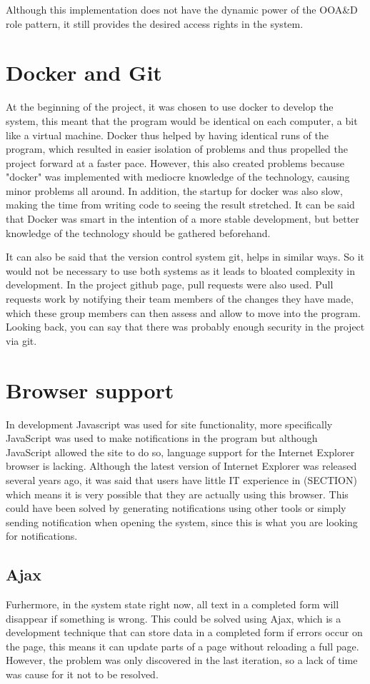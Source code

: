 Although this implementation does not have the dynamic power of the OOA\&D role pattern, it still provides the desired access rights in the system.

\section{Docker and Git}

At the beginning of the project, it was chosen to use docker to develop the system, this meant that the program would be identical on each computer, a bit like a virtual machine.
Docker thus helped by having identical runs of the program, which resulted in easier isolation of problems and thus propelled the project forward at a faster pace.
However, this also created problems because "docker" was implemented with mediocre knowledge of the technology, causing minor problems all around.
In addition, the startup for docker was also slow, making the time from writing code to seeing the result stretched.
It can be said that Docker was smart in the intention of a more stable development, but better knowledge of the technology should be gathered beforehand.

It can also be said that the version control system git, helps in similar ways.
So it would not be necessary to use both systems as it leads to bloated complexity in development.
In the project github page, pull requests were also used.
Pull requests work by notifying their team members of the changes they have made, which these group members can then assess and allow to move into the program.
Looking back, you can say that there was probably enough security in the project via git.

\section{Browser support}

In development Javascript was used for site functionality, more specifically JavaScript was used to make notifications in the program but although JavaScript allowed the site to do so, language support for the Internet Explorer browser is lacking.
Although the latest version of Internet Explorer was released several years ago, it was said that users have little IT experience in (SECTION) which means it is very possible that they are actually using this browser.
This could have been solved by generating notifications using other tools or simply sending notification when opening the system, since this is what you are looking for notifications.

\subsection{Ajax}

Furhermore, in the system state right now, all text in a completed form will disappear if something is wrong.
This could be solved using Ajax, which is a development technique that can store data in a completed form if errors occur on the page, this means it can update parts of a page without reloading a full page.
However, the problem was only discovered in the last iteration, so a lack of time was cause for it not to be resolved.
